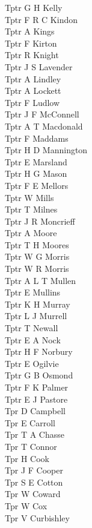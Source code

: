 \begin{multicols}{3}
  Tptr G H Kelly \\
  Tptr F R C Kindon \\
  Tptr A Kings \\
  Tptr F Kirton \\
  Tptr R Knight \\
  Tptr J S Lavender \\
  Tptr A Lindley \\
  Tptr A Lockett \\
  Tptr F Ludlow \\
  Tptr J F McConnell \\
  Tptr A T Macdonald \\
  Tptr F Maddams \\
  Tptr H D Mannington \\
  Tptr E Marsland \\
  Tptr H G Mason \\
  Tptr F E Mellors \\
  Tptr W Mills \\
  Tptr T Milnes \\
  Tptr J R Moncrieff \\
  Tptr A Moore \\
  Tptr T H Moores \\
  Tptr W G Morris \\
  Tptr W R Morris \\
  Tptr A L T Mullen \\
  Tptr E Mullins \\
  Tptr K H Murray \\
  Tptr L J Murrell \\
  Tptr T Newall \\
  Tptr E A Nock \\
  Tptr H F Norbury \\
  Tptr E Ogilvie \\
  Tptr G B Osmond \\
  Tptr F K Palmer \\
  Tptr E J Pastore \\
  Tpr D Campbell \\
  Tpr E Carroll \\
  Tpr T A Chasse \\
  Tpr T Connor \\
  Tpr H Cook \\
  Tpr J F Cooper \\
  Tpr S E Cotton \\
  Tpr W Coward \\
  Tpr W Cox \\
  Tpr V Curbishley \\

\end{multicols}
